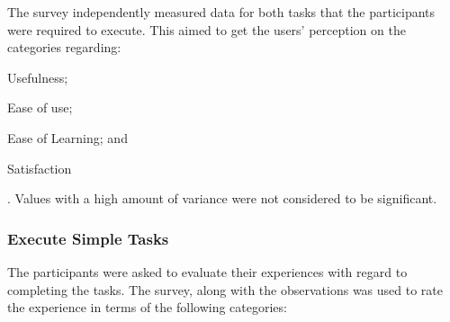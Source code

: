 \documentclass[12pt,a4paper]{report}
\begin{document}
The survey independently measured data for both tasks that the participants were
required to execute. This aimed to get the users' perception on the categories
regarding: \begin{inparaenum}[(i)] \item Usefulness; \item Ease of use; \item
Ease of Learning; and \item Satisfaction \end{inparaenum}. Values with a high
amount of variance were not considered to be significant.\\

\subsubsection{Execute Simple Tasks}
The participants were asked to evaluate their experiences with regard to 
completing the tasks. The survey, along with the observations was used to 
rate the experience in terms of the following categories:
\end{document}

